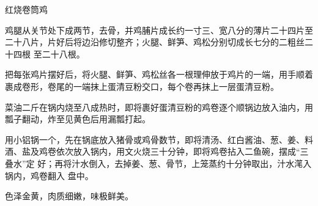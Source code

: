 %
%
%
%
%
%
%
\begin{recipe}{红烧卷筒鸡}

\ingredients


\preparation

\step 鸡腿从关节处下成两节，去骨，并鸡脯片成长约一寸三、宽八分的薄片二十四片至
二十八片，片好后将边沿修切整齐；火腿、鲜笋、鸡松分别切成长七分的二粗丝二十四根
至二十八根。

\step 把每张鸡片摆好后，将火腿、鲜笋、鸡松丝各一根理伸放于鸡片的一端，用手顺着
裹成卷形，卷尾的一端抹上蛋清豆粉交口，每个卷再抹上一层蛋清豆粉。

\step 菜油二斤在锅内烧至八成热时，即将裹好蛋清豆粉的鸡卷逐个顺锅边放入油内，用
瓢子翻动，炸至见黄色后用漏瓢打起。

\step 用小铝锅一个，先在锅底放入猪骨或鸡骨数节，即将清汤、红白酱油、葱、姜、料
酒、盐及鸡卷依次放入锅内，用文火烧三十分钟，即将鸡卷拈入二鱼碗，摆成“三叠水”定
好；再将汁水倒入，去掉姜、葱、骨节，上笼蒸约十分钟取出，汁水滗入锅内，鸡卷翻入
盘中。

\features

色泽金黄，肉质细嫩，味极鲜美。

\end{recipe}

